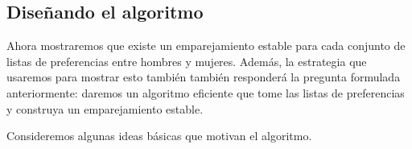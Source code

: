 \documentclass[a4paper, 12pt]{book}
\theoremstyle{dotless}
\begin{document}
\subsection*{Diseñando el algoritmo}

Ahora mostraremos que existe un emparejamiento estable para cada conjunto de listas de preferencias entre hombres y mujeres. Además, la estrategia que usaremos para mostrar esto también también responderá la pregunta formulada anteriormente: daremos un algoritmo eficiente que tome las listas de preferencias y construya un emparejamiento estable.  

Consideremos algunas ideas básicas que motivan el algoritmo. 

\end{document}
